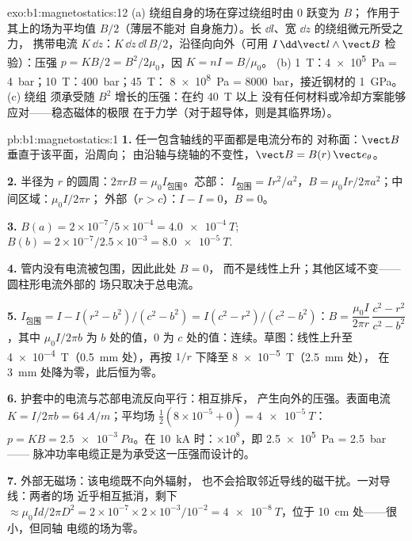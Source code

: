 \begin{solution}{exo:b1:magnetostatics:12}
(a) 绕组自身的场在穿过绕组时由 $0$ 跃变为 $B$；
作用于其上的场为平均值 $B/2$（薄层不能对
自身施力）。长 $\dd l$、宽 $\dd z$ 的绕组微元所受之力，
携带电流 $K\,\dd z$：$K\,\dd z\,\dd l\,B/2$，沿径向向外（可用 $I\,\dd\vect l
\wedge\vect B$ 检验）：压强 $p = KB/2 = B^2/2\mu_0$，因 $K = nI = B/\mu_0$。
(b) \qty{1}{T}：\qty{4e5}{Pa} = \qty{4}{bar}；\qty{10}{T}：\qty{400}{bar}；\qty{45}{T}：
\qty{8e8}{Pa} = \qty{8000}{bar}，接近钢材的 \qty{1}{GPa}。(c) 绕组
须承受随 $B^2$ 增长的压强：在约 \qty{40}{T} 以上
没有任何材料或冷却方案能够应对——稳态磁体的极限
在于力学（对于超导体，则是其临界场）。
\end{solution}

\begin{solution}{pb:b1:magnetostatics:1}
\textbf{1.} 任一包含轴线的平面都是电流分布的
对称面：$\vect B$ 垂直于该平面，沿周向；
由沿轴与绕轴的不变性，$\vect B = B(r)\,\vect e_\theta$。

\textbf{2.} 半径为 $r$ 的圆周：$2\pi rB = \mu_0I_{\text{包围}}$。芯部：
$I_{\text{包围}} = Ir^2/a^2$，$B = \mu_0Ir/2\pi a^2$；中间区域：$\mu_0I/2\pi r$；
外部（$r > c$）：$I - I = 0$，$B = 0$。

\textbf{3.} $B(a) = 2 \times 10^{-7}/5 \times 10^{-4} = \qty{4.0e-4}{T}$; $B(b) = 2 \times
10^{-7}/2.5 \times 10^{-3} = \qty{8.0e-5}{T}$.

\textbf{4.} 管内没有电流被包围，因此此处 $B = 0$，
而不是线性上升；其他区域不变——圆柱形电流外部的
场只取决于总电流。

\textbf{5.} $I_{\text{包围}} = I - I(r^2 - b^2)/(c^2 - b^2) = I(c^2 - r^2)/(c^2 -
b^2)$：$B = \dfrac{\mu_0I}{2\pi r}\,\dfrac{c^2 - r^2}{c^2 - b^2}$，其中 $\mu_0I/2\pi b$ 为
$b$ 处的值，$0$ 为 $c$ 处的值：连续。草图：线性上升至
\qty{4e-4}{T}（\qty{0.5}{mm} 处），再按 $1/r$ 下降至 \qty{8e-5}{T}（\qty{2.5}{mm} 处），
在 \qty{3}{mm} 处降为零，此后恒为零。

\textbf{6.} 护套中的电流与芯部电流反向平行：相互排斥，
产生向外的压强。表面电流 $K = I/2\pi b = \qty{64}{A/m}$；平均场
$\tfrac12(8 \times 10^{-5} + 0) = \qty{4e-5}{T}$：$p = KB = \qty{2.5e-3}{Pa}$。在
\qty{10}{kA} 时：$\times10^8$，即 \qty{2.5e5}{Pa} = \qty{2.5}{bar}——
脉冲功率电缆正是为承受这一压强而设计的。

\textbf{7.} 外部无磁场：该电缆既不向外辐射，
也不会拾取邻近导线的磁干扰。一对导线：两者的场
近乎相互抵消，剩下 $\approx \mu_0Id/2\pi D^2 = 2 \times 10^{-7} \times 2 \times
10^{-3}/10^{-2} = \qty{4e-8}{T}$，位于 \qty{10}{cm} 处——很小，但同轴
电缆的场为零。


\end{solution}
